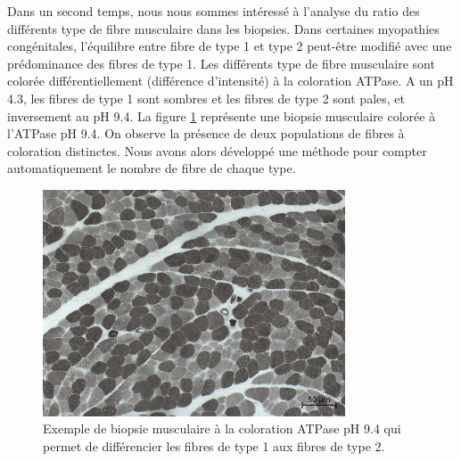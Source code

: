 Dans un second temps, nous nous sommes intéressé à l'analyse du ratio des différents type de fibre musculaire dans les biopsies. Dans certaines myopathies congénitales, l'équilibre entre fibre de type 1 et type 2 peut-être modifié avec une prédominance des fibres de type 1. Les différents type de fibre musculaire sont colorée différentiellement (différence d'intensité) à la coloration ATPase. A un pH 4.3, les fibres de type 1 sont sombres et les fibres de type 2 sont pales, et inversement au pH 9.4. La figure \ref{fig:atp_example} représente une biopsie musculaire colorée à l'ATPase pH 9.4. On observe la présence de deux populations de fibres à coloration distinctes. Nous avons alors développé une méthode pour compter automatiquement le nombre de fibre de chaque type.
\begin{figure}[htbp]
 \centering
 \includegraphics[width=0.8\textwidth]{figures/atp_example.png}
 \caption[Exemple de biopsie musculaire à la coloration ATPase pH 9.4]{Exemple de biopsie musculaire à la coloration ATPase pH 9.4 qui permet de différencier les fibres de type 1 aux fibres de type 2.}
 \label{fig:atp_example}
\end{figure}
